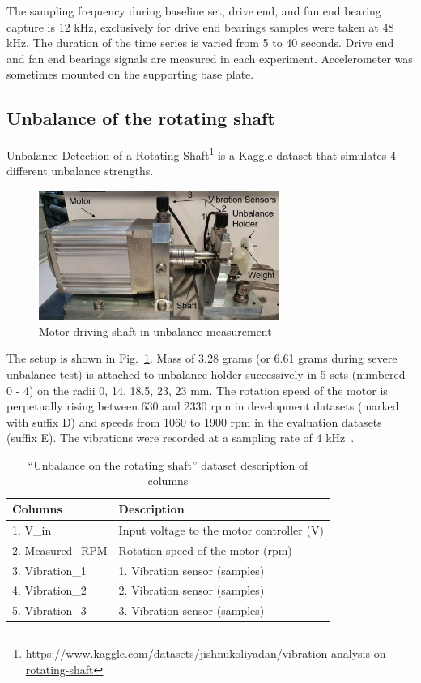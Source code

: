 The sampling frequency during baseline set, drive end, and fan end bearing capture is 12 kHz, exclusively for drive end bearings samples were taken at 48 kHz. The duration of the time series is varied from 5 to 40 seconds. Drive end and fan end bearings signals are measured in each experiment. Accelerometer was sometimes mounted on the supporting base plate.

\subsection{Unbalance of the rotating shaft}
Unbalance Detection of a Rotating Shaft\footnote{\url{https://www.kaggle.com/datasets/jishnukoliyadan/vibration-analysis-on-rotating-shaft}} is a Kaggle dataset that simulates 4 different unbalance strengths. 
\begin{figure}[h]
\centering
\includegraphics[width=0.7\textwidth]{assets/analysis/rotating-shaft.jpg}
\caption{Motor driving shaft in unbalance measurement \cite{mey_machine_2020}}
\label{fig:rotating-shaft}
\end{figure}

The setup is shown in Fig.~\ref{fig:rotating-shaft}. Mass of 3.28 grams (or 6.61 grams during severe unbalance test) is attached to unbalance holder successively in 5 sets (numbered 0 - 4) on the radii 0, 14, 18.5, 23, 23 mm. The rotation speed of the motor is perpetually rising between 630 and 2330 rpm in development datasets (marked with suffix D) and speeds from 1060 to 1900 rpm in the evaluation datasets (suffix E). The vibrations were recorded at a sampling rate of 4 kHz~\cite{mey_machine_2020}.

\begin{table}[h]
\centering
\renewcommand{\arraystretch}{1.2}
\begin{tabular}{|l|l|}
\hline
\textbf{Columns} & \textbf{Description}                      \\ \hline
1. V\_in         & Input voltage to the motor controller (V) \\ \hline
2. Measured\_RPM & Rotation speed of the motor (rpm)  \\ \hline
3. Vibration\_1  & 1. Vibration sensor (samples)             \\ \hline
4. Vibration\_2  & 2. Vibration sensor (samples)             \\ \hline
5. Vibration\_3  & 3. Vibration sensor (samples)             \\ \hline
\end{tabular}
\caption{``Unbalance on the rotating shaft'' dataset description of columns}
\end{table}

